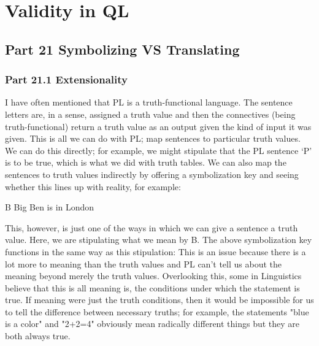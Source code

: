 \part{Validity in QL}
\label{ch.qlvalidity}
\chapter{Part 21 Symbolizing VS Translating}
\section{Part 21.1 Extensionality}
I have often mentioned that PL is a truth-functional language. The sentence letters are, in a sense, assigned a truth value and then the connectives (being truth-functional) return a truth value as an output given the kind of input it was given. This is all we can do with PL; map sentences to particular truth values. We can do this directly; for example, we might stipulate that the PL sentence ‘P’ is to be true, which is what we did with truth tables. We can also map the sentences to truth values indirectly by offering a symbolization key and seeing whether this lines up with reality, for example:
\begin{ekey}
\item[B] Big Ben is in London
\end{ekey}
This, however, is just one of the ways in which we can give a sentence a truth value. Here, we are stipulating what we mean by B. The above symbolization key functions in the same way as this stipulation:
This is an issue because there is a lot more to meaning than the truth values and PL can't tell us about the meaning beyond merely the truth values. Overlooking this, some in Linguistics believe that this is all meaning is, the conditions under which the statement is true. If meaning were just the truth conditions, then it would be impossible for us to tell the difference between necessary truths; for example, the statements "blue is a color" and "2+2=4" obviously mean radically different things but they are both always true.

